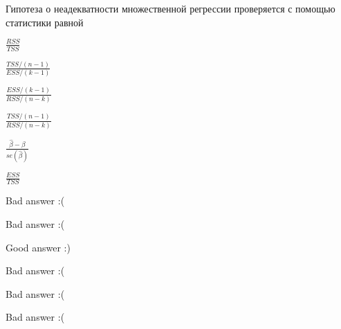 
\begin{question}
Гипотеза о неадекватности множественной регрессии проверяется с помощью статистики равной
\begin{answerlist}
  \item \(\frac{RSS}{TSS}\)
  \item \(\frac{TSS/(n-1)}{ESS/(k-1)}\)
  \item \(\frac{ESS/(k-1)}{RSS/(n-k)}\)
  \item \(\frac{TSS/(n-1)}{RSS/(n-k)}\)
  \item \(\frac{\hat \beta - \beta}{se(\hat \beta)}\)
  \item \(\frac{ESS}{TSS}\)
\end{answerlist}
\end{question}

\begin{solution}
\begin{answerlist}
  \item Bad answer :(
  \item Bad answer :(
  \item Good answer :)
  \item Bad answer :(
  \item Bad answer :(
  \item Bad answer :(
\end{answerlist}
\end{solution}

